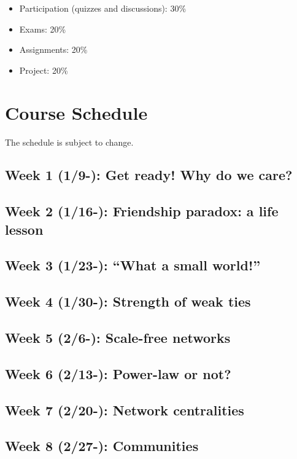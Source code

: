 \documentclass[11pt,article,oneside]{memoir}
\begin{document}
\begin{itemize}

\item Participation (quizzes and discussions): 30\%

\item Exams: 20\%

\item Assignments: 20\%

\item Project: 20\%


\end{itemize}

\section{Course Schedule}

The schedule is subject to change. 

\subsection{Week 1 (1/9-):  Get ready! Why do we care?}
\subsection{Week 2 (1/16-):  Friendship paradox: a life lesson}
\subsection{Week 3 (1/23-):  ``What a small world!''}
\subsection{Week 4 (1/30-):  Strength of weak ties} %
\subsection{Week 5 (2/6-):  Scale-free networks} %
\subsection{Week 6 (2/13-):  Power-law or not?}
\subsection{Week 7 (2/20-):  Network centralities} 
\subsection{Week 8 (2/27-):  Communities}
\end{document}
